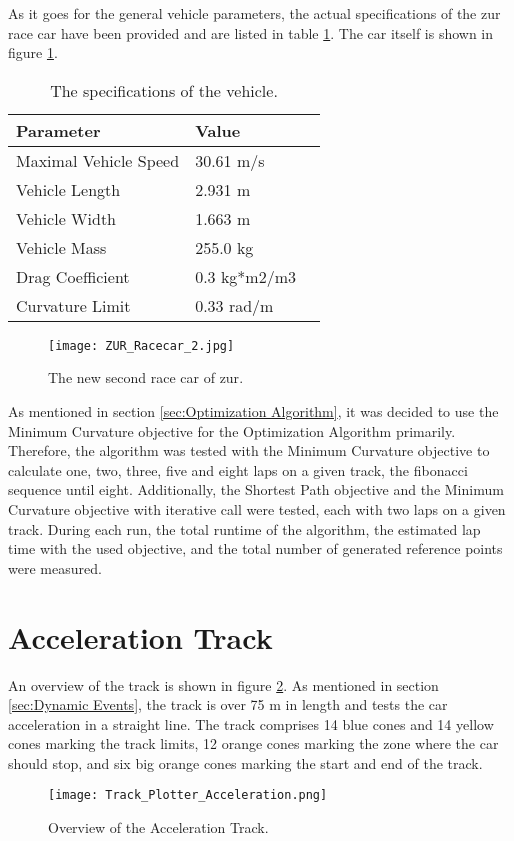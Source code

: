 As it goes for the general vehicle parameters, the actual specifications of the \acrshort{zur} race car have been provided and are listed in table \ref{tab:ZUR Vehicle Specifications}. The car itself is shown in figure \ref{fig:ZUR Racecar 2}.
\begin{table}[H]
    \centering
    \begin{tabular}{|l|l|l|}
        \hline
        \textbf{Parameter}    & \textbf{Value} \\ \hline
        Maximal Vehicle Speed & 30.61 m/s      \\ \hline
        Vehicle Length        & 2.931 m        \\ \hline
        Vehicle Width         & 1.663 m        \\ \hline
        Vehicle Mass          & 255.0 kg       \\ \hline
        Drag Coefficient      & 0.3 kg*m2/m3   \\ \hline
        Curvature Limit       & 0.33 rad/m     \\ \hline
    \end{tabular}
    \caption{The specifications of the vehicle.}
    \label{tab:ZUR Vehicle Specifications}
\end{table}
\begin{figure}[H]
    \centering
    \texttt{[image: ZUR\_Racecar\_2.jpg]}
    \caption{The new second race car of \acrlong{zur}.}
    \label{fig:ZUR Racecar 2}
\end{figure}

As mentioned in section \ref{sec:Optimization Algorithm}, it was decided to use the Minimum Curvature objective for the Optimization Algorithm primarily. Therefore, the algorithm was tested with the Minimum Curvature objective to calculate one, two, three, five and eight laps on a given track, the \Gls{fibonacci} sequence until eight. Additionally, the Shortest Path objective and the Minimum Curvature objective with iterative call were tested, each with two laps on a given track. During each run, the total runtime of the algorithm, the estimated lap time with the used objective, and the total number of generated reference points were measured.

\pagebreak

\section{Acceleration Track} \label{sec:Results Acceleration Track}
An overview of the track is shown in figure \ref{fig:Results Acceleration Initial}. As mentioned in section \ref{sec:Dynamic Events}, the track is over 75 m in length and tests the car acceleration in a straight line. The track comprises 14 blue cones and 14 yellow cones marking the track limits, 12 orange cones marking the zone where the car should stop, and six big orange cones marking the start and end of the track.
\begin{figure}[H]
    \centering
    \texttt{[image: Track\_Plotter\_Acceleration.png]}
    \caption{Overview of the Acceleration Track.}
    \label{fig:Results Acceleration Initial}
\end{figure}

